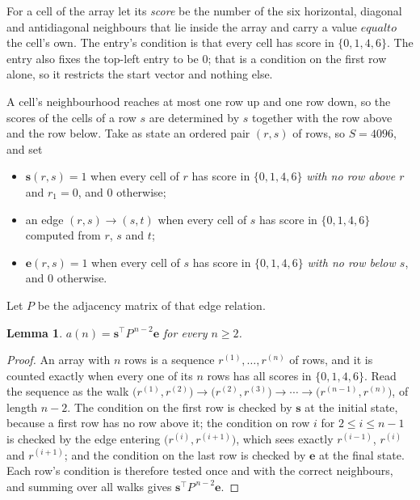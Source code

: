 \documentclass[11pt,a4paper]{article}
\theoremstyle{plain}
\newtheorem{lemma}[theorem]{Lemma}
\theoremstyle{definition}
\begin{document}
For a cell of the array let its \emph{score} be the number of the six horizontal, diagonal and antidiagonal neighbours that lie inside
the array and carry a value $equal to$ the cell's own. The entry's condition is that every cell
has score in $\{0,1,4,6\}$. The entry also fixes the top-left entry to be $0$; that is a condition on the first row alone, so it restricts the start vector and nothing else.

A cell's neighbourhood reaches at most one row up and one row down, so the scores of the
cells of a row $s$ are determined by $s$ together with the row above and the row below.
Take as state an ordered pair $(r,s)$ of rows, so $S=4096$, and set
\begin{itemize}
\item $\mathbf{s}(r,s)=1$ when every cell of $r$ has score in $\{0,1,4,6\}$ \emph{with no row
above $r$} and $r_1=0$, and $0$ otherwise;
\item an edge $(r,s)\to(s,t)$ when every cell of $s$ has score in $\{0,1,4,6\}$ computed from
$r$, $s$ and $t$;
\item $\mathbf{e}(r,s)=1$ when every cell of $s$ has score in $\{0,1,4,6\}$ \emph{with no row
below $s$}, and $0$ otherwise.
\end{itemize}
Let $P$ be the adjacency matrix of that edge relation.

\begin{lemma}\label{lem:walk}
$a(n)=\mathbf{s}^{\!\top}P^{\,n-2}\mathbf{e}$ for every $n\ge2$.
\end{lemma}

\begin{proof}
An array with $n$ rows is a sequence $r^{(1)},\dots,r^{(n)}$ of rows, and it is counted
exactly when every one of its $n$ rows has all scores in $\{0,1,4,6\}$. Read the sequence as the
walk $\bigl(r^{(1)},r^{(2)}\bigr)\to\bigl(r^{(2)},r^{(3)}\bigr)\to\cdots\to
\bigl(r^{(n-1)},r^{(n)}\bigr)$, of length $n-2$. The condition on the first row is
checked by $\mathbf{s}$ at the initial state, because a first row has no row above it; the
condition on row $i$ for $2\le i\le n-1$ is checked by the edge entering
$\bigl(r^{(i)},r^{(i+1)}\bigr)$, which sees exactly $r^{(i-1)}$, $r^{(i)}$ and
$r^{(i+1)}$; and the condition on the last row is checked by $\mathbf{e}$ at the final
state. Each row's condition is therefore tested once and with the correct neighbours, and
summing over all walks gives $\mathbf{s}^{\!\top}P^{\,n-2}\mathbf{e}$.
\end{proof}
\end{document}
